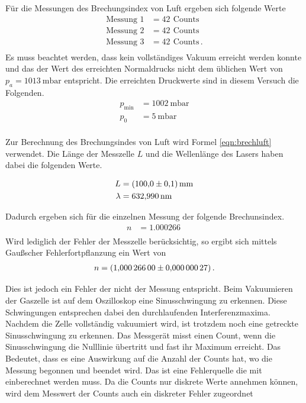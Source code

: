 Für die Messungen des Brechungsindex von Luft ergeben sich folgende Werte
\begin{align*}
  \text{Messung 1} &= \SI{42}{}\, \text{Counts} \\
  \text{Messung 2} &= \SI{42}{}\, \text{Counts} \\
  \text{Messung 3} &= \SI{42}{}\, \text{Counts} \, . \\
\end{align*}
Es muss beachtet werden, dass kein vollständiges Vakuum erreicht werden konnte
und das der Wert des erreichten Normaldrucks nicht dem üblichen Wert von
$p_a= \SI{1013}{\milli\bar}$ \cite{druck} entspricht. Die erreichten Druckwerte sind in
diesem Versuch die Folgenden.
\begin{align*}
  p_{\text{min}} &= \SI{1002}{\milli\bar} \\
  p_0            &= \SI{5}{\milli\bar} \\
\end{align*}

Zur Berechnung des Brechungsindes von Luft wird Formel \ref{eqn:brechluft}
verwendet. Die Länge der Messzelle $L$ und die Wellenlänge des Lasers
haben dabei die folgenden Werte.

\begin{align*}
  L &= \SI{100 \pm 0.1}{\milli\meter} \\
  \lambda &= \SI{632.990}{\nano\meter} \\
\end{align*}

Dadurch ergeben sich für die einzelnen Messung der folgende Brechunsindex.
\begin{align*}
  n &= \SI{1.000266}{} \\
\end{align*}
Wird lediglich der Fehler der Messzelle berücksichtig, so ergibt sich mittels
Gaußscher Fehlerfortpflanzung ein Wert von
\begin{align*}
  n = \SI{1.000266 \pm 0.00000027}{} \, .\\
\end{align*}

Dies ist jedoch ein Fehler der nicht der Messung entspricht. Beim Vakuumieren
der Gaszelle ist auf dem Oszilloskop eine Sinusschwingung zu erkennen. Diese
Schwingungen entsprechen dabei den durchlaufenden Interferenzmaxima. Nachdem
die Zelle vollständig vakuumiert wird, ist trotzdem noch eine getreckte
Sinusschwingung zu erkennen. Das Messgerät misst einen Count, wenn die
Sinusschwingung die Nulllinie übertritt und fast ihr Maximum erreicht. Das
Bedeutet, dass es eine Auswirkung auf die Anzahl der Counts hat, wo die
Messung begonnen und beendet wird. Das ist eine Fehlerquelle die mit einberechnet werden
muss. Da die Counts nur diskrete Werte annehmen können, wird dem Messwert
der Counts auch ein diskreter Fehler zugeordnet

